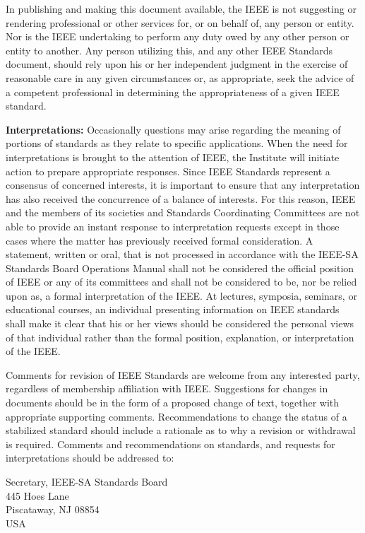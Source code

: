 In publishing and making this document available, the IEEE is not suggesting or rendering professional or other services for, or on behalf of, any person or entity. Nor is the IEEE undertaking to perform any duty owed by any other person or entity to another. Any person utilizing this, and any other IEEE Standards document, should rely upon his or her independent judgment in the exercise of reasonable care in any given circumstances or, as appropriate, seek the advice of a competent professional in determining the appropriateness of a given IEEE standard.

\textbf{Interpretations:} Occasionally questions may arise regarding the meaning of portions of standards as they relate to specific applications. When the need for interpretations is brought to the attention of IEEE, the Institute will initiate action to prepare appropriate responses. Since IEEE Standards represent a consensus of concerned interests, it is important to ensure that any interpretation has also received the concurrence of a balance of interests. For this reason, IEEE and the members of its societies and Standards Coordinating Committees are not able to provide an instant response to interpretation requests except in those cases where the matter has previously received formal consideration. A statement, written or oral, that is not processed in accordance with the IEEE-SA Standards Board Operations Manual shall not be considered the official position of IEEE or any of its committees and shall not be considered to be, nor be relied upon as, a formal interpretation of the IEEE. At lectures, symposia, seminars, or educational courses, an individual presenting information on IEEE standards shall make it clear that his or her views should be considered the personal views of that individual rather than the formal position, explanation, or interpretation of the IEEE.

Comments for revision of IEEE Standards are welcome from any interested party, regardless of membership affiliation with IEEE. Suggestions for changes in documents should be in the form of a proposed change of text, together with appropriate supporting comments. Recommendations to change the status of a stabilized standard should include a rationale as to why a revision or withdrawal is required. Comments and recommendations on standards, and requests for interpretations should be addressed to:

\begin{center}
    Secretary, IEEE-SA Standards Board\\
    445 Hoes Lane\\
    Piscataway, NJ 08854\\
    USA
\end{center}

